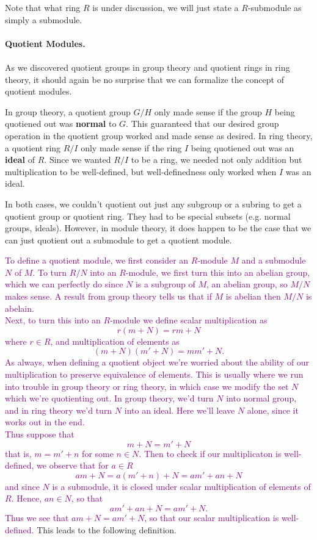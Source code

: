 Note that what ring $R$ is under discussion, we will
just state a $R$-submodule as simply a submodule.
\\
\\
\textbf{Quotient Modules.}
\\
\\
As we discovered quotient groups in group theory and quotient
rings in ring theory, it should again be no surprise that we can
formalize the concept of quotient modules. 

In group theory, a quotient group $G/H$ only made sense if the
group $H$
being quotiened out was \textbf{normal} to $G$. This
guaranteed that our desired group operation in the quotient group
worked and made sense as desired. In ring theory, a quotient ring
$R/I$ only made
sense if the ring $I$ being quotiened out was an \textbf{ideal} of
$R$. Since we wanted $R/I$ to be a ring, we needed not only
addition but multiplication to be well-defined, but
well-definedness only worked when $I$ was an ideal. 

In both cases, we couldn't quotient out just any subgroup or a
subring to get a quotient group or quotient ring. They had to be
special subsets (e.g. normal groups, ideals). 
However, in
module theory, it does happen to be the case that we can just
quotient out a submodule to get a quotient module. 

\textcolor{purple}{
To define a quotient module, we first consider an $R$-module $M$
and a submodule $N$ of $M$. To turn $R/N$ into an $R$-module, we
first turn this into an abelian group, which we can perfectly do
since $N$ is a subgroup of $M$, an abelian group, so $M/N$ makes
sense. A result from group theory tells us that if $M$ is abelian
then $M/N$ is abelain. 
\\
\indent Next, to turn this into an $R$-module we define scalar
multiplication as 
\[
    r(m + N) = rm + N
\]
where $r \in R$, and multiplication of elements as
\[
    (m + N)(m' + N) = mm' + N.   
\]
As always, when defining a quotient object we're
worried about the ability of our multiplication to preserve
equivalence of elements. This is usually where we run into trouble
in group theory or ring theory, in which case we modify the set
$N$ which we're quotienting out. In group theory, we'd turn $N$ into
normal group, and in ring theory we'd turn $N$ into an ideal. Here
we'll leave $N$ alone, since it works out in the end.
\\
\indent Thus 
suppose that
\[
    m + N = m' + N
\]
that is, $m = m' + n$ for some $n \in N$. 
Then to check if our 
multiplicaton is well-defined, we observe that for $a \in R$
\[
    am + N = a(m' + n) + N = am' + an + N
\]
and since $N$ is a submodule, it is closed under scalar
multiplication of elements of $R$. Hence, $an \in N$, so that 
\[
    am' + an + N = am' + N.
\]
Thus we see that $am + N = am' + N$, so that our scalar
multiplication is well-defined.
}
This leads to the following definition.

